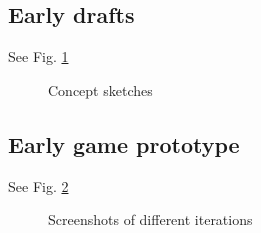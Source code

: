 \documentclass{article}
\begin{document}
\clearpage

    \subsection{Early drafts}
        See Fig. \ref{fig:concepts}
        \begin{figure}

            \caption{Concept sketches}
            \label{fig:concepts}
        \end{figure}

\clearpage

    \subsection{Early game prototype}
        See Fig. \ref{fig:prototype_screenshots}
        \begin{figure}

            \caption{Screenshots of different iterations}
            \label{fig:prototype_screenshots}
        \end{figure}
\end{document}
